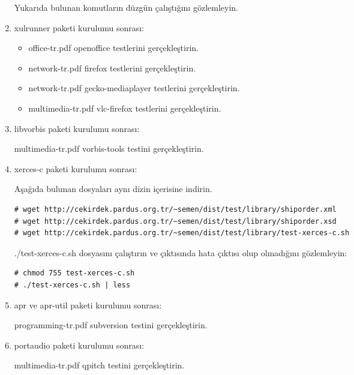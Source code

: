 \documentclass[a4paper,10pt]{article}
\begin{document}
\begin{enumerate}
Yukarıda bulunan komutların düzgün çalıştığını gözlemleyin.

\item xulrunner paketi kurulumu sonrası:
\begin{itemize}
\item office-tr.pdf openoffice testlerini gerçekleştirin.
\item network-tr.pdf firefox testlerini gerçekleştirin.
\item network-tr.pdf gecko-mediaplayer testlerini gerçekleştirin.
\item multimedia-tr.pdf vlc-firefox testlerini gerçekleştirin.
\end{itemize}

\item libvorbis paketi kurulumu sonrası:

multimedia-tr.pdf vorbis-tools testini gerçekleştirin.

\item xerces-c paketi kurulumu sonrası:

Aşağıda bulunan dosyaları aynı dizin içerisine indirin.
\begin{verbatim}
# wget http://cekirdek.pardus.org.tr/~semen/dist/test/library/shiporder.xml
# wget http://cekirdek.pardus.org.tr/~semen/dist/test/library/shiporder.xsd
# wget http://cekirdek.pardus.org.tr/~semen/dist/test/library/test-xerces-c.sh
\end{verbatim}

./test-xerces-c.sh dosyasını çalıştırın ve çıktısında hata çıktısı olup olmadığını gözlemleyin:
\begin{verbatim}
# chmod 755 test-xerces-c.sh
# ./test-xerces-c.sh | less
\end{verbatim}

\item apr ve apr-util paketi kurulumu sonrası:

programming-tr.pdf subversion testini gerçekleştirin.

\item portaudio paketi kurulumu sonrası:

multimedia-tr.pdf qpitch testini gerçekleştirin.
\end{enumerate}
\end{document}
